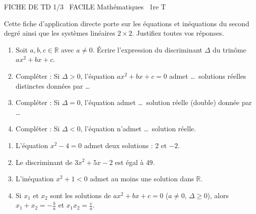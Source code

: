 \documentclass[11pt]{article}
\begin{document}
\begin{tcolorbox}[enhanced,colback=popink,colframe=popink,arc=10pt,boxrule=0pt,left=12pt,right=12pt,top=9pt,bottom=9pt]
{\color{white}\popxbold\small FICHE DE TD 1/3 \textbullet\ FACILE \hfill Mathématiques \textbullet\ 1re T\par}
\end{tcolorbox}
\vspace{4pt}
\noindent Cette fiche d'application directe porte sur les équations et inéquations du second degré ainsi que les systèmes linéaires $2 \times 2$. Justifiez toutes vos réponses.

\begin{exercice}
\begin{enumerate}
    \item Soit $a, b, c \in \mathbb{R}$ avec $a \neq 0$. Écrire l'expression du discriminant $\Delta$ du trinôme $ax^2+bx+c$.
    \item Compléter : Si $\Delta > 0$, l'équation $ax^2+bx+c=0$ admet \ldots\ solutions réelles distinctes données par \ldots
    \item Compléter : Si $\Delta = 0$, l'équation admet \ldots\ solution réelle (double) donnée par \ldots
    \item Compléter : Si $\Delta < 0$, l'équation n'admet \ldots\ solution réelle.
\end{enumerate}
\end{exercice}

\begin{exercice}
\begin{enumerate}
    \item L'équation $x^2 - 4 = 0$ admet deux solutions : $2$ et $-2$.
    \item Le discriminant de $3x^2 + 5x - 2$ est égal à $49$.
    \item L'inéquation $x^2 + 1 < 0$ admet au moins une solution dans $\mathbb{R}$.
    \item Si $x_1$ et $x_2$ sont les solutions de $ax^2+bx+c=0$ ($a \neq 0$, $\Delta \geq 0$), alors $x_1+x_2 = -\frac{b}{a}$ et $x_1x_2 = \frac{c}{a}$.
\end{enumerate}
\end{exercice}
\end{document}
